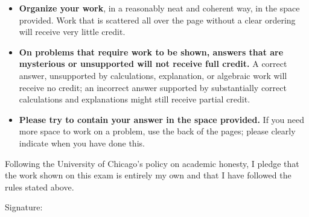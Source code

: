 \documentclass[11pt]{exam}
\begin{document}
\begin{minipage}[t]{6.25in}
\vspace{0pt}
\begin{itemize}


\item \textbf{Organize your work}, in a reasonably neat and coherent way, in
the space provided. Work that is scattered all over the page without a clear ordering will 
receive very little credit.  

\item \textbf{On problems that require work to be shown, answers that are mysterious or unsupported will not receive full
credit.}  A correct answer, unsupported by calculations, explanation,
or algebraic work will receive no credit; an incorrect answer supported
by substantially correct calculations and explanations might still receive
partial credit.


\item \textbf{Please try to contain your answer in the space provided.} If you need more space to work on a problem, use the back of the pages; please clearly indicate when you have done this.
\end{itemize}



\end{minipage}

\bigskip
\bigskip
\medskip

Following the University of Chicago's policy on academic honesty, I pledge that the work shown on this exam is entirely my own and that I have followed the rules stated above. 

\bigskip
\bigskip
\bigskip

\qquad Signature: \hrulefill

\hspace*{0mm}\phantom{}

\vfill


\end{document}
